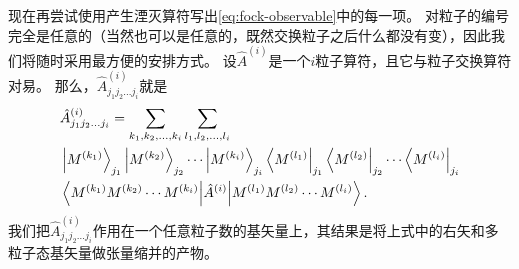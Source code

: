 \documentclass[hyperref, UTF8, a4paper]{ctexart}
\newenvironment{bigcase}{\left\{\quad\begin{aligned}}{\end{aligned}\right.}
\begin{document}
现在再尝试使用产生湮灭算符写出\eqref{eq:fock-observable}中的每一项。
对粒子的编号完全是任意的（当然也可以是任意的，既然交换粒子之后什么都没有变），因此我们将随时采用最方便的安排方式。
设$\hat{A}^{(i)}$是一个$i$粒子算符，且它与粒子交换算符对易。
那么，$\hat{A}^{(i)}_{j_1 j_2 \ldots j_i}$就是
\[
    \begin{aligned}
        &\hat{A}^{(i)}_{j_1 j_2 \ldots j_i} 
        = \sum_{k_1, k_2, \ldots, k_i} \sum_{l_1, l_2, \ldots, l_i} \\
        &\ket{M^{(k_1)}}_{j_1} \ket{M^{(k_2)}}_{j_2} \cdots \ket{M^{(k_i)}}_{j_i} 
        \bra{M^{(l_1)}}_{j_1} \bra{M^{(l_2)}}_{j_2} \cdots \bra{M^{(l_i)}}_{j_i} \\ 
        &\mel{M^{(k_1)} M^{(k_2)} \cdots M^{(k_i)}}{\hat{A}^{(i)}}{M^{(l_1)} M^{(l_2)} \cdots M^{(l_i)}}.
    \end{aligned}
\]
我们把$\hat{A}^{(i)}_{j_1 j_2 \ldots j_i}$作用在一个任意粒子数的基矢量上，其结果是将上式中的右矢和多粒子态基矢量做张量缩并的产物。
\end{document}
